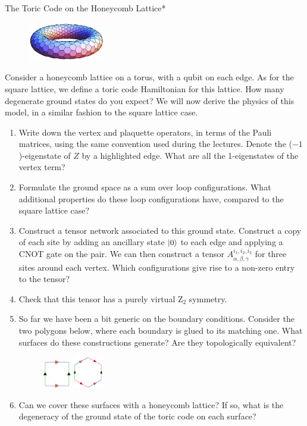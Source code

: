 \documentclass[a4paper,10pt,twoside]{article}
\begin{document}
\newpage

\begin{section}{The Toric Code on the Honeycomb Lattice*}
\begin{figure}[h]
  \centerline{\includegraphics[width=0.3\textwidth]{img/torus.png}}
\end{figure}
Consider a honeycomb lattice on a torus, with a qubit on each edge.
As for the square lattice, we define a toric code Hamiltonian for this lattice.
How many degenerate ground states do you expect?
We will now derive the physics of this model, in a similar fashion to the square lattice case.
\begin{enumerate}[label=(\alph*)]
\item Write down the vertex and plaquette operators, in terms of the Pauli matrices, using the same convention used during the lectures.
 Denote the ($-1$)-eigenstate of $Z$ by a highlighted edge.
What are all the 1-eigenstates of the vertex term?
\item Formulate the ground space as a sum over loop configurations. 
What additional properties do these loop configurations have, compared to the square lattice case?
\item Construct a tensor network associated to this ground state. 
Construct a copy of each site by adding an ancillary state $\ket{0}$ to each edge and applying a CNOT gate on the pair.
We can then construct a tensor $A^{i_1,i_2,i_3}_{\alpha,\beta,\gamma}$ for three sites around each vertex.
Which configurations give rise to a non-zero entry to the tensor?
\item Check that this tensor has a purely virtual $\mathrm{Z}_2$ symmetry.
\item So far we have been a bit generic on the boundary conditions.
Consider the two polygons below, where each boundary is glued to its matching one. 
What surfaces do these constructions generate? 
Are they topologically equivalent?
\begin{figure}[h]
  \centerline{
    \includegraphics[width=0.12\textwidth]{img/fundamental_square.png}
    \hspace{4em}
    \includegraphics[width=0.12\textwidth]{img/fundamental_hex.png}
  }
\end{figure}
\item Can we cover these surfaces with a honeycomb lattice? 
If so, what is the degeneracy of the ground state of the toric code on each surface?
\end{enumerate}
\end{section}
\end{document}
